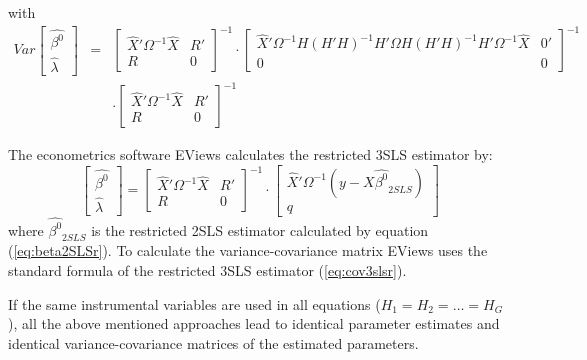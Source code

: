 with
\begin{eqnarray}
   Var 
   \left[ \begin{array}{c}
      \widehat{\beta^0} \\ \widehat{\lambda}
   \end{array} \right] 
   & = & 
   \left[ \begin{array}{cc}
      \widehat{X}' \Omega^{-1} \widehat{X} & R' \\ 
      R & 0
   \end{array} \right]^{-1}
   \cdot
   \left[ \begin{array}{cc}
      \widehat{X}' \Omega^{-1} H \left( H' H \right)^{-1} H' \Omega
      H \left( H' H \right)^{-1} H' \Omega^{-1} \widehat{X} & 0' \\ 
      0 & 0
   \end{array} \right]^{-1}
   \nonumber \\
   & & \cdot
   \left[ \begin{array}{cc}
      \widehat{X}' \Omega^{-1} \widehat{X} & R' \\ 
      R & 0
   \end{array} \right]^{-1}
\end{eqnarray}


The econometrics software EViews calculates the restricted 3SLS estimator by:
\begin{equation}
   \left[ \begin{array}{c}
      \widehat{\beta^0} \\ \widehat{\lambda}
   \end{array} \right]
   =
   \left[ \begin{array}{cc}
      \widehat{X}' \Omega^{-1} \widehat{X} & R' \\ 
      R & 0
   \end{array} \right]^{-1}
   \cdot
   \left[ \begin{array}{c}
      \widehat{X}' \Omega^{-1} \left( y - X \widehat{\beta^0}_{2SLS} \right) 
      \\ q 
   \end{array} \right]
\end{equation}
where $\widehat{\beta^0}_{2SLS}$ is the restricted 2SLS estimator calculated
by equation (\ref{eq:beta2SLSr}). 
To calculate the variance-covariance matrix 
EViews uses the standard formula of the restricted 3SLS estimator
(\ref{eq:cov3slsr}).


If the same instrumental variables are used in all equations 
($H_1 = H_2 = \ldots = H_G$), 
all the above mentioned approaches lead to identical parameter estimates
and identical variance-covariance matrices of the estimated parameters.

